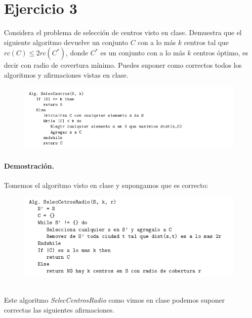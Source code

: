 \documentclass[12pt]{article}
\begin{document}
\section{Ejercicio 3}
	\paragraph{} Considera el problema de selección de centros visto en clase. Demuestra que el siguiente algoritmo devuelve un conjunto $C$ con a lo más $k$ centros tal que $rc(C)\leq 2rc(C^*)$, donde $C^*$ es un conjunto con a lo más $k$ centros óptimo, es decir con radio de covertura mínimo. Puedes suponer como correctos todos los algoritmos y afirmaciones vistas en clase.
	\begin{figure}[h]
		\begin{center}
			\includegraphics[width=\textwidth]{AlgCentros}
		\end{center}
	\end{figure}
	\paragraph{Demostración.} Tomemos el algoritmo visto en clase y supongamos que es correcto:\\
	\pagebreak
	\begin{figure}[h]
		\begin{center}
			\includegraphics[width=\textwidth]{alg_centros}
		\end{center}
	\end{figure}\\
	Este algoritmo \textit{SelecCentrosRadio} como vimos en clase podemos suponer correctas las siguientes afirmaciones.
\end{document}
